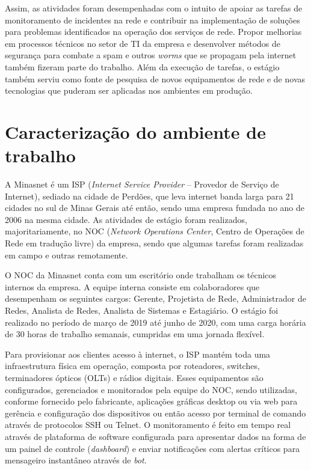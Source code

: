     Assim, as atividades foram desempenhadas com o intuito de apoiar as tarefas de monitoramento de incidentes na rede e contribuir na implementação de soluções para problemas identificados na operação dos serviços de rede. Propor melhorias em processos técnicos no setor de TI da empresa e desenvolver métodos de segurança para combate a spam e outros \textit{worms} que se propagam pela internet também fizeram parte do trabalho. Além da execução de tarefas, o estágio também serviu como fonte de pesquisa de novos equipamentos de rede e de novas tecnologias que puderam ser aplicadas nos ambientes em produção.

\section{Caracterização do ambiente de trabalho}

    A Minasnet é um ISP (\textit{Internet Service Provider} -- Provedor de Serviço de Internet), sediado na cidade de Perdões, que leva internet banda larga para 21 cidades no sul de Minas Gerais até então, sendo uma empresa fundada no ano de 2006 na mesma cidade. As atividades de estágio foram realizados, majoritariamente, no NOC (\textit{Network Operations Center}, Centro de Operações de Rede em tradução livre) da empresa, sendo que algumas tarefas foram realizadas em campo e outras remotamente.

    O NOC da Minasnet conta com um escritório onde trabalham os técnicos internos da empresa. A equipe interna consiste em colaboradores que desempenham os seguintes cargos: Gerente, Projetista de Rede, Administrador de Redes, Analista de Redes, Analista de Sistemas e Estagiário. O estágio foi realizado no período de março de 2019 até junho de 2020, com uma carga horária de 30 horas de trabalho semanais, cumpridas em uma jornada flexível.

    Para provisionar aos clientes acesso à internet, o ISP mantém toda uma infraestrutura física em operação, composta por roteadores, switches, terminadores ópticos (OLTs) e rádios digitais. Esses equipamentos são configurados, gerenciados e monitorados pela equipe do NOC, sendo utilizadas, conforme fornecido pelo fabricante, aplicações gráficas desktop ou via web para gerência e configuração dos dispositivos ou então acesso por terminal de comando através de protocolos SSH ou Telnet. O monitoramento é feito em tempo real através de plataforma de software configurada para apresentar dados na forma de um painel de controle (\textit{dashboard}) e enviar notificações com alertas críticos para mensageiro instantâneo através de \textit{bot}.
    
